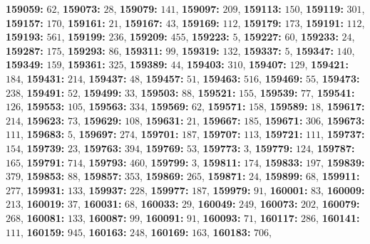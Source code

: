 \textsf{\bfseries 159059:} $62$, \textsf{\bfseries 159073:} $28$, \textsf{\bfseries 159079:} $141$, \textsf{\bfseries 159097:} $209$, \textsf{\bfseries 159113:} $150$, \textsf{\bfseries 159119:} $301$, \textsf{\bfseries 159157:} $170$, \textsf{\bfseries 159161:} $21$, \textsf{\bfseries 159167:} $43$, \textsf{\bfseries 159169:} $112$, \textsf{\bfseries 159179:} $173$, \textsf{\bfseries 159191:} $112$, \textsf{\bfseries 159193:} $561$, \textsf{\bfseries 159199:} $236$, \textsf{\bfseries 159209:} $455$, \textsf{\bfseries 159223:} $5$, \textsf{\bfseries 159227:} $60$, \textsf{\bfseries 159233:} $24$, \textsf{\bfseries 159287:} $175$, \textsf{\bfseries 159293:} $86$, \textsf{\bfseries 159311:} $99$, \textsf{\bfseries 159319:} $132$, \textsf{\bfseries 159337:} $5$, \textsf{\bfseries 159347:} $140$, \textsf{\bfseries 159349:} $159$, \textsf{\bfseries 159361:} $325$, \textsf{\bfseries 159389:} $44$, \textsf{\bfseries 159403:} $310$, \textsf{\bfseries 159407:} $129$, \textsf{\bfseries 159421:} $184$, \textsf{\bfseries 159431:} $214$, \textsf{\bfseries 159437:} $48$, \textsf{\bfseries 159457:} $51$, \textsf{\bfseries 159463:} $516$, \textsf{\bfseries 159469:} $55$, \textsf{\bfseries 159473:} $238$, \textsf{\bfseries 159491:} $52$, \textsf{\bfseries 159499:} $33$, \textsf{\bfseries 159503:} $88$, \textsf{\bfseries 159521:} $155$, \textsf{\bfseries 159539:} $77$, \textsf{\bfseries 159541:} $126$, \textsf{\bfseries 159553:} $105$, \textsf{\bfseries 159563:} $334$, \textsf{\bfseries 159569:} $62$, \textsf{\bfseries 159571:} $158$, \textsf{\bfseries 159589:} $18$, \textsf{\bfseries 159617:} $214$, \textsf{\bfseries 159623:} $73$, \textsf{\bfseries 159629:} $108$, \textsf{\bfseries 159631:} $21$, \textsf{\bfseries 159667:} $185$, \textsf{\bfseries 159671:} $306$, \textsf{\bfseries 159673:} $111$, \textsf{\bfseries 159683:} $5$, \textsf{\bfseries 159697:} $274$, \textsf{\bfseries 159701:} $187$, \textsf{\bfseries 159707:} $113$, \textsf{\bfseries 159721:} $111$, \textsf{\bfseries 159737:} $154$, \textsf{\bfseries 159739:} $23$, \textsf{\bfseries 159763:} $394$, \textsf{\bfseries 159769:} $53$, \textsf{\bfseries 159773:} $3$, \textsf{\bfseries 159779:} $124$, \textsf{\bfseries 159787:} $165$, \textsf{\bfseries 159791:} $714$, \textsf{\bfseries 159793:} $460$, \textsf{\bfseries 159799:} $3$, \textsf{\bfseries 159811:} $174$, \textsf{\bfseries 159833:} $197$, \textsf{\bfseries 159839:} $379$, \textsf{\bfseries 159853:} $88$, \textsf{\bfseries 159857:} $353$, \textsf{\bfseries 159869:} $265$, \textsf{\bfseries 159871:} $24$, \textsf{\bfseries 159899:} $68$, \textsf{\bfseries 159911:} $277$, \textsf{\bfseries 159931:} $133$, \textsf{\bfseries 159937:} $228$, \textsf{\bfseries 159977:} $187$, \textsf{\bfseries 159979:} $91$, \textsf{\bfseries 160001:} $83$, \textsf{\bfseries 160009:} $213$, \textsf{\bfseries 160019:} $37$, \textsf{\bfseries 160031:} $68$, \textsf{\bfseries 160033:} $29$, \textsf{\bfseries 160049:} $249$, \textsf{\bfseries 160073:} $202$, \textsf{\bfseries 160079:} $268$, \textsf{\bfseries 160081:} $133$, \textsf{\bfseries 160087:} $99$, \textsf{\bfseries 160091:} $91$, \textsf{\bfseries 160093:} $71$, \textsf{\bfseries 160117:} $286$, \textsf{\bfseries 160141:} $111$, \textsf{\bfseries 160159:} $945$, \textsf{\bfseries 160163:} $248$, \textsf{\bfseries 160169:} $163$, \textsf{\bfseries 160183:} $706$, 
